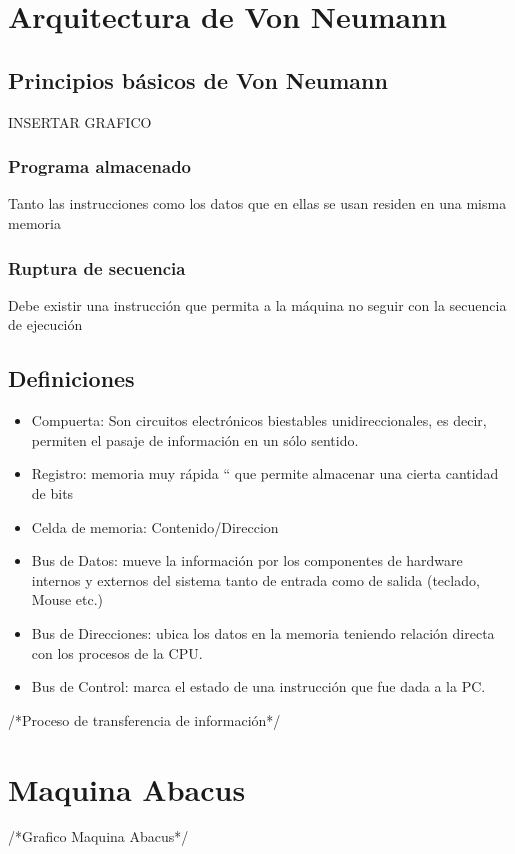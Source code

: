 \section{Arquitectura de Von Neumann}

\subsection{Principios básicos de Von Neumann}

INSERTAR GRAFICO

\subsubsection{Programa almacenado}
Tanto las instrucciones como los datos que en ellas se usan residen en una misma memoria
\subsubsection{Ruptura de secuencia}
Debe existir una instrucción que permita a la máquina no seguir con la secuencia de ejecución

\subsection{Definiciones}
\begin{itemize}
\item Compuerta: Son circuitos electrónicos biestables unidireccionales, es decir, permiten el pasaje de información en un sólo sentido.
\item Registro: memoria muy rápida “ que permite almacenar una cierta cantidad de bits
\item Celda de memoria: Contenido/Direccion
\item Bus de Datos: mueve la información por los componentes de hardware internos y externos del sistema tanto de entrada como de salida (teclado, Mouse etc.)
\item Bus de Direcciones: ubica los datos en la memoria teniendo relación directa con los procesos de la CPU.
\item Bus de Control: marca el estado de una instrucción que fue dada a la PC.
\end{itemize}

/*Proceso de transferencia de información*/

\section{Maquina Abacus}
/*Grafico Maquina Abacus*/

